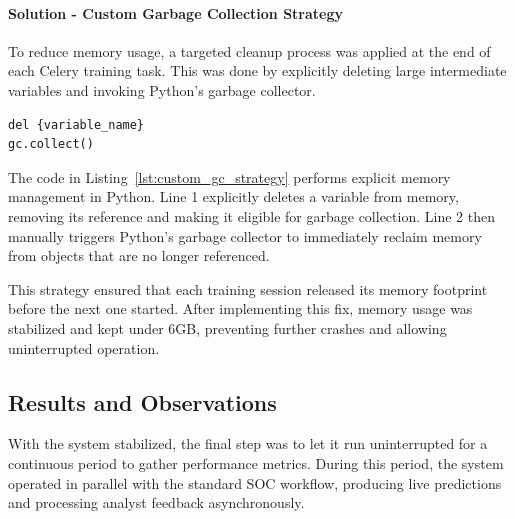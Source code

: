 \paragraph{Solution - Custom Garbage Collection Strategy}

To reduce memory usage, a targeted cleanup process was applied at the end of each Celery training task. 
This was done by explicitly deleting large intermediate variables and invoking Python's garbage collector.

\vspace{0.2cm}
\noindent
\begin{minipage}{\linewidth}
\begin{verbatim}
del {variable_name}
gc.collect()
\end{verbatim}
\label{lst:custom_gc_strategy}
\end{minipage}
\vspace{0.1cm}

The code in Listing~\ref{lst:custom_gc_strategy} performs explicit memory management in Python. 
Line 1 explicitly deletes a variable from memory, removing its reference and making it eligible for garbage collection. 
Line 2 then manually triggers Python's garbage collector to immediately reclaim memory from objects that are no longer referenced.

This strategy ensured that each training session released its memory footprint before the next one started. 
After implementing this fix, memory usage was stabilized and kept under 6GB, preventing further crashes and allowing uninterrupted operation.

\subsection{Results and Observations}

With the system stabilized, the final step was to let it run uninterrupted for a continuous period to gather performance metrics. 
During this period, the system operated in parallel with the standard SOC workflow, producing live predictions and processing analyst feedback asynchronously.



